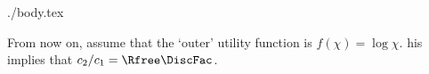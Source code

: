 \documentclass{handout}
\begin{document}
\begin{verbatimwrite}{./body.tex}

  
From now on, assume that the `outer' utility function is ${f}(\chi)  = \log \chi$.
his implies that $c_{2}/c_{1} = \Rfree\DiscFac$.

\end{verbatimwrite}
\end{document}
